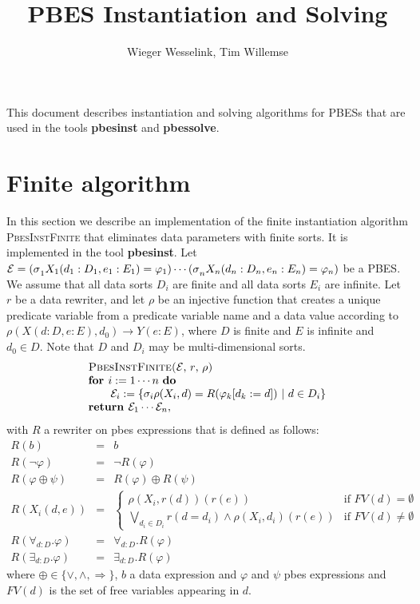 \documentclass{article}
\begin{document}
\title{PBES Instantiation and Solving}
\author{Wieger Wesselink, Tim Willemse}
\maketitle

This document describes instantiation and solving algorithms for PBESs that
are used in the tools \textbf{pbesinst} and \textbf{pbessolve}.

\section{Finite algorithm}

In this section we describe an implementation of the finite instantiation
algorithm \textsc{PbesInstFinite} that eliminates data parameters with
finite sorts. It is implemented in the tool \textbf{pbesinst}. Let $\mathcal{%
E=(\sigma }_{1}X_{1}(d_{1}:D_{1},e_{1}:E_{1})=\varphi _{1})\cdots \mathcal{%
(\sigma }_{n}X_{n}(d_{n}:D_{n},e_{n}:E_{n})=\varphi _{n})$ be a PBES. We
assume that all data sorts $D_{i}$ are finite and all data sorts $E_{i}$ are
infinite. Let $r$ be a data rewriter, and let $\rho $ be an injective
function that creates a unique predicate variable from a predicate variable
name and a data value according to $\rho (X(d:D,e:E),d_{0})\rightarrow Y(e:E)
$, where $D$ is finite and $E$ is infinite and $d_{0}\in D$. Note that $D$
and $D_{i}$ may be multi-dimensional sorts.%
\begin{equation*}
\begin{array}{l}
\text{\textsc{PbesInstFinite(}}\mathcal{E}\text{, }r\text{, }\rho \text{%
\textsc{)}} \\
\text{\textbf{for }}i:=1\cdots n\text{ \textbf{do}} \\
\qquad \mathcal{E}_{i}:=\{\mathcal{\sigma }_{i}\rho (X_{i},d)=R(\varphi
_{k}[d_{k}:=d])\ |\ d\in D_{i}\} \\
\text{\textbf{return }}\mathcal{E}_{1}\cdots \mathcal{E}_{n},%
\end{array}%
\end{equation*}%
with $R$ a rewriter on pbes expressions that is defined as follows:%
\begin{eqnarray*}
R(b) &=&b \\
R(\lnot \varphi ) &=&\lnot R(\varphi ) \\
R(\varphi \oplus \psi ) &=&R(\varphi )\oplus R(\psi ) \\
R(X_{i}(d,e)) &=&\left\{
\begin{array}{cc}
\rho (X_{i},r(d))(r(e)) & \text{if }FV(d)=\emptyset  \\
\bigvee\limits_{d_{i}\in D_{i}}r(d=d_{i})\wedge \rho (X_{i},d_{i})(r(e)) &
\text{if }FV(d)\neq \emptyset
\end{array}%
\right.  \\
R(\forall _{d:D}.\varphi ) &=&\forall _{d:D}.R(\varphi ) \\
R(\exists _{d:D}.\varphi ) &=&\exists _{d:D}.R(\varphi )
\end{eqnarray*}%
where $\oplus \in \{\vee ,\wedge ,\Rightarrow \}$, $b$ a data expression and
$\varphi $ and $\psi $ pbes expressions and $FV(d)$ is the set of free
variables appearing in $d$.\newpage
\end{document}
